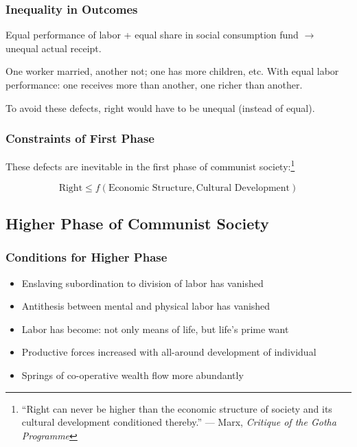 \documentclass[12pt,a4paper]{article}
\begin{document}
\subsubsection{Inequality in Outcomes}

Equal performance of labor + equal share in social consumption fund $\rightarrow$ unequal actual receipt.

One worker married, another not; one has more children, etc. With equal labor performance: one receives more than another, one richer than another.

To avoid these defects, right would have to be unequal (instead of equal).

\subsubsection{Constraints of First Phase}

These defects are inevitable in the first phase of communist society:\footnote{``Right can never be higher than the economic structure of society and its cultural development conditioned thereby.'' --- Marx, \textit{Critique of the Gotha Programme}}

\begin{equation}
\text{Right} \leq f(\text{Economic Structure}, \text{Cultural Development})
\end{equation}

\subsection{Higher Phase of Communist Society}

\subsubsection{Conditions for Higher Phase}

\begin{itemize}
\item Enslaving subordination to division of labor has vanished
\item Antithesis between mental and physical labor has vanished
\item Labor has become: not only means of life, but life's prime want
\item Productive forces increased with all-around development of individual
\item Springs of co-operative wealth flow more abundantly
\end{itemize}
\end{document}
